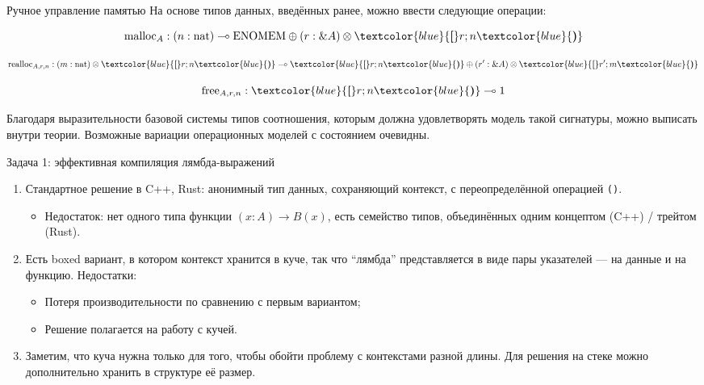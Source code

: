 \documentclass{beamer}
\begin{document}
\begin{frame}{Ручное управление памятью}
  На основе типов данных, введённых ранее, можно ввести следующие операции:

  \[
    \mathrm{malloc}_A : (n : \mathrm{nat}) \multimap \mathrm{ENOMEM}
      \oplus (r : \& A) \otimes
      \textcolor{blue}{\boldsymbol{[}}r; n\textcolor{blue}{\boldsymbol{)}}
  \]

  \[
    \mathrm{realloc}_{A, r, n} : (m : \mathrm{nat}) \otimes
      \textcolor{blue}{\boldsymbol{[}}r; n\textcolor{blue}{\boldsymbol{)}}
      \multimap
      \textcolor{blue}{\boldsymbol{[}}r; n\textcolor{blue}{\boldsymbol{)}}
      \oplus
      (r' : \& A) \otimes
      \textcolor{blue}{\boldsymbol{[}}r'; m\textcolor{blue}{\boldsymbol{)}}
  \]

  \[
    \mathrm{free}_{A, r, n} :
      \textcolor{blue}{\boldsymbol{[}}r; n\textcolor{blue}{\boldsymbol{)}}
      \multimap 1
  \]

  Благодаря выразительности базовой системы типов соотношения, которым должна
  удовлетворять модель такой сигнатуры, можно выписать внутри теории. Возможные
  вариации операционных моделей с состоянием очевидны.
\end{frame}

\begin{frame}[fragile]{Задача 1: эффективная компиляция лямбда-выражений}
  \begin{enumerate}
    \item Стандартное решение в C++, Rust: анонимный тип данных, сохраняющий
      контекст, с переопределённой операцией \verb|()|.
      \begin{itemize}
        \item Недостаток: нет одного типа функции $(x : A) \to B(x)$, есть
          семейство типов, объединённых одним концептом (C++) / трейтом (Rust).
      \end{itemize}
    \item Есть boxed вариант, в котором контекст хранится в куче, так что
      ``лямбда'' представляется в виде пары указателей --- на данные и на
      функцию. Недостатки:
      \begin{itemize}
        \item Потеря производительности по сравнению с первым вариантом;
        \item Решение полагается на работу с кучей.
      \end{itemize}
    \item Заметим, что куча нужна только для того, чтобы обойти проблему с
      контекстами разной длины. Для решения на стеке можно дополнительно хранить
      в структуре её размер.
  \end{enumerate}
\end{frame}
\end{document}
